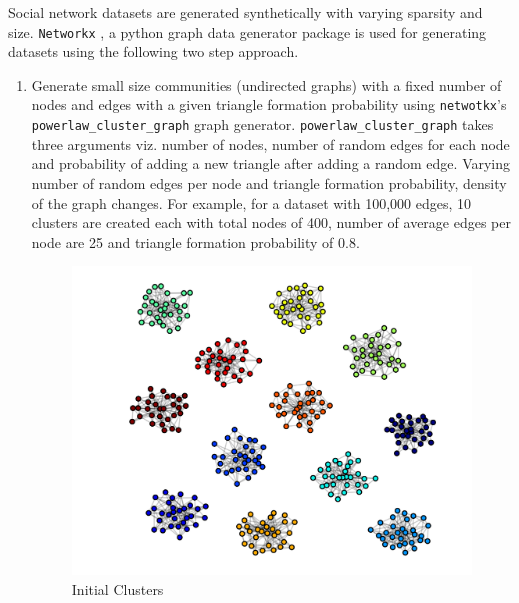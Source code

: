 Social network datasets are generated synthetically with varying sparsity and size. \texttt{Networkx} \cite{networkx}, a python graph data generator package is used for generating datasets using the following two step approach.
\begin{enumerate}
	\item
	Generate small size communities (undirected graphs) with a fixed number of nodes and edges with a given triangle formation probability using \texttt{netwotkx}'s \texttt{powerlaw\_cluster\_graph} graph generator. \texttt{powerlaw\_cluster\_graph} takes three arguments viz. number of nodes, number of random edges for each node and probability of adding a new triangle after adding a random edge. Varying number of random edges per node and triangle formation probability, density of the graph changes. For example, for a dataset with 100,000 edges, 10 clusters are created each with total nodes of 400, number of average edges per node are 25 and triangle formation probability of 0.8.\\
	\begin{figure}[H]
		\begin{minipage}{.5\textwidth}
			\centering
			\includegraphics[scale=0.22]{Images/datasetgen1.pdf}
			\caption{Initial Clusters}	
		\end{minipage}
		\begin{minipage}{.5\textwidth}
			\centering

\end{minipage}
\end{figure}
\end{enumerate}
